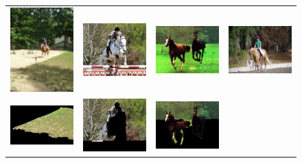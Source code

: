 \documentclass[10pt,twocolumn,letterpaper]{article}
\begin{document}
\begin{figure}[p]
\centering
\begin{tabular}{ p{3cm} p{3cm} p{3cm} p{3cm} }
\includegraphics[width=2.95cm]{figures/add_res/horse/2008_000403.jpg.eps} &
\includegraphics[width=2.95cm]{figures/add_res/horse/2008_002835.jpg.eps} &
\includegraphics[width=2.95cm]{figures/add_res/horse/2008_003055.jpg.eps} &
\includegraphics[width=2.95cm]{figures/add_res/horse/2008_004470.jpg.eps} \\
\includegraphics[width=2.95cm]{figures/add_res/horse/2008_000403.jpg_3_bad.jpg.eps} &
\includegraphics[width=2.95cm]{figures/add_res/horse/2008_002835.jpg_3_bad.jpg.eps} &
\includegraphics[width=2.95cm]{figures/add_res/horse/2008_003055.jpg_3_okay.jpg.eps} &

\end{tabular}
\end{figure}
\end{document}
